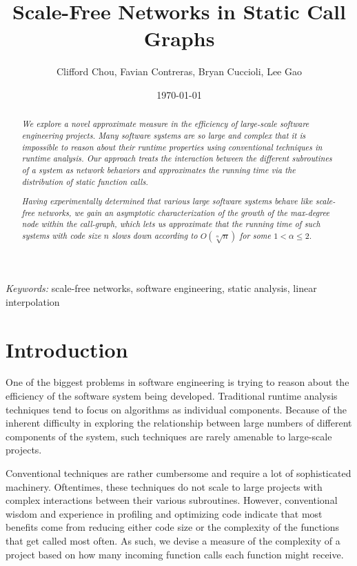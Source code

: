 \documentclass[11pt,a4paper,twocolumn]{article}
\author{Clifford Chou, Favian Contreras, Bryan Cuccioli, Lee Gao}
\title{Scale-Free Networks in Static Call Graphs}
\date{\today}
\begin{document}
\begin{singlespace}

\maketitle

\begin{abstract}
\emph{We explore a novel approximate measure in the efficiency of large-scale
software engineering projects. Many software systems are so large and complex
that it is impossible to reason about their runtime properties using
conventional techniques in runtime analysis. Our approach treats the
interaction between the different subroutines of a system as network behaviors
and approximates the running time via the distribution of static function
calls.}

\emph{Having experimentally determined that various large software systems
behave like scale-free networks, we gain an asymptotic characterization of the
growth of the max-degree node within the call-graph, which lets us approximate
that the running time of such systems with code size $n$ slows down according
to $O\left(\sqrt[\alpha]{n}\right)$ for some $1<\alpha\leq 2$.}
\end{abstract}

\hspace*{3,6mm}\textit{Keywords:} {\sf \small scale-free networks, software
engineering, static analysis, linear interpolation}
\vspace{10pt}

\section{Introduction}

One of the biggest problems in software engineering is trying to reason about
the efficiency of the software system being developed. Traditional runtime
analysis techniques tend to focus on algorithms as individual components.
Because of the inherent difficulty in exploring the relationship between
large numbers of different components of the system, such techniques are
rarely amenable to large-scale projects.

Conventional techniques are rather cumbersome and require a lot of
sophisticated machinery. Oftentimes, these techniques do not scale to large
projects with complex interactions between their various subroutines. However,
conventional wisdom and experience in profiling and optimizing code indicate
that most benefits come from reducing either code size or the complexity of
the functions that get called most often. As such, we devise a measure of the
complexity of a project based on how many incoming function calls each
function might receive.


\end{singlespace}
\end{document}
